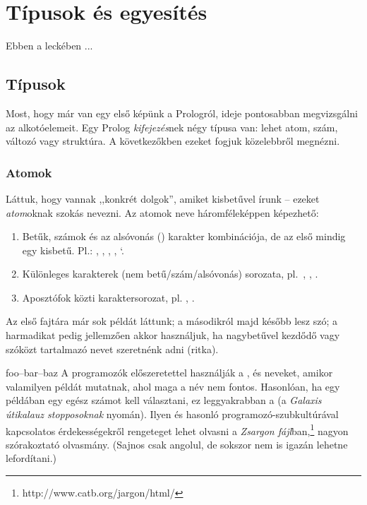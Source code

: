 
\chapter{Típusok és egyesítés}
Ebben a leckében ...
\section{Típusok}
Most, hogy már van egy első képünk a Prologról,
ideje pontosabban megvizsgálni az alkotóelemeit.
Egy Prolog \emph{kifejezés}\/nek négy típusa van:
lehet atom, szám, változó vagy struktúra. A
következőkben ezeket fogjuk közelebbről
megnézni.
\subsection*{Atomok}
Láttuk, hogy vannak ,,konkrét dolgok'', amiket
kisbetűvel írunk -- ezeket \emph{atom}\/oknak szokás
nevezni. Az atomok neve háromféleképpen képezhető:
\begin{enumerate}
\item Betűk, számok és az alsóvonás (\pr{\_})
  karakter kombinációja, de az első mindig egy
  kisbetű. Pl.: , , ,
  , `.
\item Különleges karakterek (nem
  betű/szám/alsóvonás) sorozata, pl.~,
  \pr{==>}, \pr{+}.
\item Aposztófok közti karaktersorozat,
  pl. , .
\end{enumerate}
Az első fajtára már sok példát láttunk; a másodikról
majd később lesz szó; a harmadikat pedig jellemzően
akkor használjuk, ha nagybetűvel kezdődő vagy
szóközt tartalmazó nevet szeretnénk adni (ritka).

\begin{infobox}{0.75}{foo--bar--baz}
A programozók előszeretettel használják a ,
 és  neveket, amikor valamilyen
példát mutatnak, ahol maga a név nem
fontos. Hasonlóan, ha egy példában egy egész számot
kell választani, ez leggyakrabban a  (a
\emph{Galaxis útikalauz stopposoknak} nyomán). Ilyen
és hasonló programozó-szubkultúrával kapcsolatos
érdekességekről rengeteget lehet olvasni a \emph{Zsargon
  fájl}\/ban,\footnote[2]{http://www.catb.org/jargon/html/}
nagyon szórakoztató olvasmány. (Sajnos csak angolul,
de sokszor nem is igazán lehetne lefordítani.)
\end{infobox}

